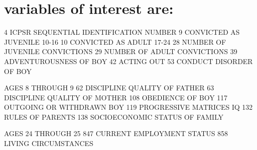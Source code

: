 \documentclass[]{article}
\begin{document}
\section{variables of interest are:}\label{variables-of-interest-are}

4 ICPSR SEQUENTIAL IDENTIFICATION NUMBER 9 CONVICTED AS JUVENILE 10-16
10 CONVICTED AS ADULT 17-24 28 NUMBER OF JUVENILE CONVICTIONS 29 NUMBER
OF ADULT CONVICTIONS 39 ADVENTUROUSNESS OF BOY 42 ACTING OUT 53 CONDUCT
DISORDER OF BOY

AGES 8 THROUGH 9 62 DISCIPLINE QUALITY OF FATHER 63 DISCIPLINE QUALITY
OF MOTHER 108 OBEDIENCE OF BOY 117 OUTGOING OR WITHDRAWN BOY 119
PROGRESSIVE MATRICES IQ 132 RULES OF PARENTS 138 SOCIOECONOMIC STATUS OF
FAMILY

AGES 24 THROUGH 25 847 CURRENT EMPLOYMENT STATUS 858 LIVING
CIRCUMSTANCES
\end{document}
